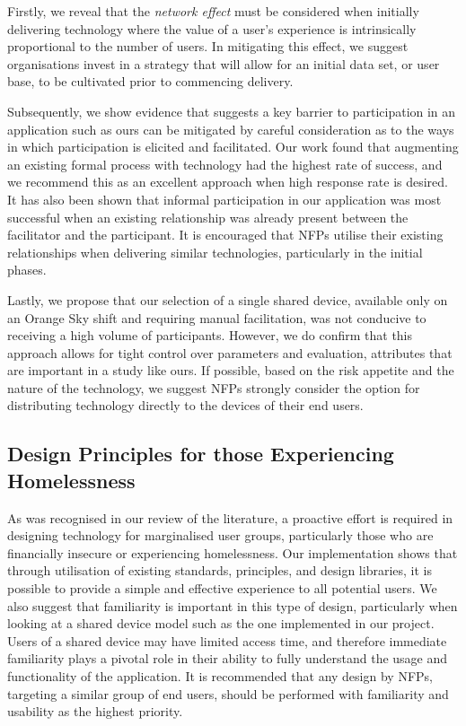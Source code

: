 Firstly, we reveal that the \emph{network effect} must be considered when initially delivering technology where the value of a user's experience is intrinsically proportional to the number of users. In mitigating this effect, we suggest organisations invest in a strategy that will allow for an initial data set, or user base, to be cultivated prior to commencing delivery. 

Subsequently, we show evidence that suggests a key barrier to participation in an application such as ours can be mitigated by careful consideration as to the ways in which participation is elicited and facilitated. Our work found that augmenting an existing formal process with technology had the highest rate of success, and we recommend this as an excellent approach when high response rate is desired. It has also been shown that informal participation in our application was most successful when an existing relationship was already present between the facilitator and the participant. It is encouraged that NFPs utilise their existing relationships when delivering similar technologies, particularly in the initial phases.

Lastly, we propose that our selection of a single shared device, available only on an Orange Sky shift and requiring manual facilitation, was not conducive to receiving a high volume of participants. However, we do confirm that this approach allows for tight control over parameters and evaluation, attributes that are important in a study like ours. If possible, based on the risk appetite and the nature of the technology, we suggest NFPs strongly consider the option for distributing technology directly to the devices of their end users.

\subsection{Design Principles for those Experiencing Homelessness}

As was recognised in our review of the literature, a proactive effort is required in designing technology for marginalised user groups, particularly those who are financially insecure or experiencing homelessness. Our implementation shows that through utilisation of existing standards, principles, and design libraries, it is possible to provide a simple and effective experience to all potential users. We also suggest that familiarity is important in this type of design, particularly when looking at a shared device model such as the one implemented in our project. Users of a shared device may have limited access time, and therefore immediate familiarity plays a pivotal role in their ability to fully understand the usage and functionality of the application. It is recommended that any design by NFPs, targeting a similar group of end users, should be performed with familiarity and usability as the highest priority.

